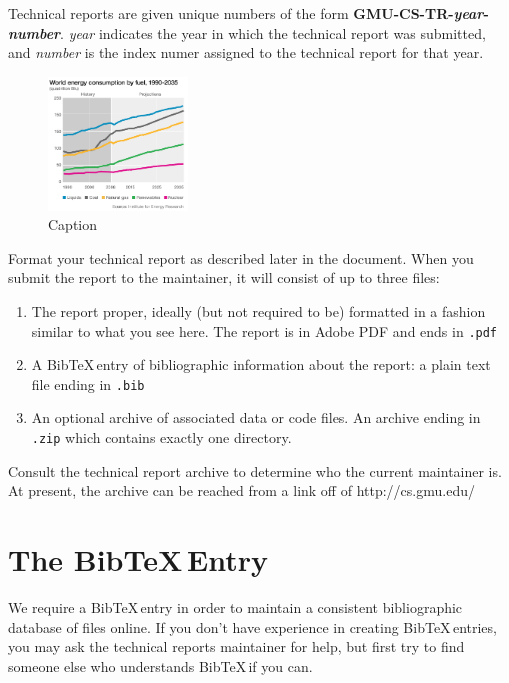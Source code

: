 \documentclass[twocolumn]{article}
\begin{document}
Technical reports are given unique numbers of the form {\bf GMU-CS-TR-\textit{year}-\textit{number}}.  {\it year} indicates the year in which the technical report was submitted, and {\it number} is the index numer assigned to the technical report for that year.

\begin{figure}[!t]
        \centering
        \includegraphics[width=0.33\textwidth]{test}
        \caption{Caption}
        \label{fig1}
\end{figure}



Format your technical report as described later in the document.  When you submit the report to the maintainer, it will consist of up to three files:

\begin{enumerate}
\item The report proper, ideally (but not required to be) formatted in a fashion similar to what you see here.  The report is in Adobe PDF and ends in {\tt .pdf}
\item A Bib\TeX \,entry of bibliographic information about the report: a plain text file ending in {\tt .bib}
\item An optional archive of associated data or code files.  An archive ending in {\tt .zip} which contains exactly one directory.
\end{enumerate}

Consult the technical report archive to determine who the current maintainer is.  At present, the archive can be reached from a link off of http:/$\!$/cs.gmu.edu/

\section{The Bib\TeX \,Entry}

We require a Bib\TeX \,entry in order to maintain a consistent bibliographic database of files online.  If you don't have experience in creating Bib\TeX \,entries, you may ask the technical reports maintainer for help, but first try to find someone else who understands Bib\TeX \,if you can.  
\end{document}
